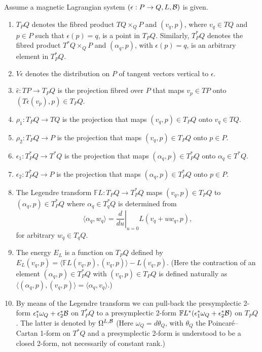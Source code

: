 \documentclass[pdftex]{sigma}
\newcommand{\B}{{\cal B}}
\newcommand{\e}{\epsilon}
\newcommand{\F}{\mathbb{F}}
\begin{document}
\begin{definition}
Assume a magnetic Lagrangian system $(\e:P\to Q, L,\B)$ is given.
\begin{enumerate}\itemsep=0pt
\item   $T_PQ$ denotes the f\/ibred product $TQ\times_Q P$ and $(v_q,p)$, where $v_q\in TQ$ and $p\in P$ such that $\e(p)=q$, is a point in $T_PQ$. Similarly, $T_P^*Q$ denotes the f\/ibred product $T^*Q\times_Q P$ and $(\alpha_q,p)$, with $\e(p)=q$, is an arbitrary element in $T^*_PQ$.
\item $V\e$ denotes the distribution on $P$ of tangent vectors vertical to $\e$.
\item $\hat \e : TP \to T_PQ$ is the projection f\/ibred over $P$ that maps $v_p\in TP$ onto $(T\e(v_p),p)\in T_PQ$.
\item $\rho_1:T_PQ \to TQ$ is the projection that maps $(v_q,p )\in T_PQ$ onto $v_q\in TQ$.
\item $\rho_2: T_PQ \to P$ is the projection that maps $(v_q,p)\in T_PQ$ onto $p\in P$.
\item $\e_1:T_P^*Q \to T^*Q$ is the projection that maps $(\alpha_q,p )\in T_P^*Q$ onto $\alpha_q\in T^*Q$.
\item $\e_2: T_P^*Q \to P$ is the projection that maps $(\alpha_q,p)\in T_P^*Q$ onto $p\in P$.
\item The Legendre transform $\F L:T_PQ \to T_P^*Q$ maps $(v_q,p)\in T_PQ$ to $(\alpha_q,p)\in T^*_PQ$ where $\alpha_q\in T^*_qQ$ is determined from \[\langle \alpha_q, w_q\rangle = \left.\frac{d}{du}\right|_{u=0} L(v_q+uw_q,p),\] for arbitrary $w_q\in T_qQ$.
\item The energy $E_L$ is a function on $T_PQ$ def\/ined by $E_L(v_q,p) =\langle \F L (v_q,p), (v_q,p)\rangle - L(v_q,p)$. (Here the contraction of an element $(\alpha_q,p)\in T^*_PQ$ with $(v_q,p)\in T_PQ$ is def\/ined naturally as $\langle (\alpha_q,p),(v_q,p) \rangle =\langle \alpha_q,v_q\rangle$.)
\item By means of the Legendre transform we can pull-back the presymplectic 2-form $\e^*_1\omega_{Q}+\e^*_2\B$ on $T^*_PQ$ to a presymplectic 2-form $\F L^*(\e^*_1\omega_{Q} +\e^*_2\B)$ on $T_PQ$. The latter is denoted by $\Omega^{L,\B}$ (Here $\omega_{Q}=d\theta_{Q}$, with $\theta_{Q}$ the Poincar\'e--Cartan 1-form on $T^*Q$ and a presymplectic 2-form is understood to be a closed 2-form, not necessarily of constant rank.)
\end{enumerate}
\end{definition}
\end{document}

